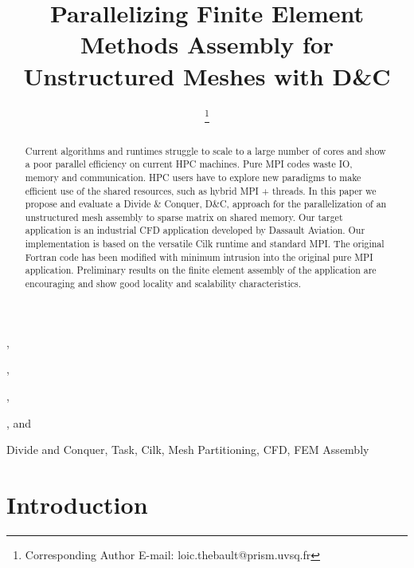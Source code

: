 \documentclass{IOS-Book-Article}
\begin{document}
\begin{frontmatter}              %

\title{Parallelizing Finite Element Methods Assembly for Unstructured Meshes with D\&C}

\author[A]{ %
\thanks{Corresponding Author E-mail: loic.thebault@prism.uvsq.fr}},
\author[A]{ },
\author[D]{ },
\author[B]{ },
and
\author[A,D]{ }

\address[A]{PRISM - University of Versailles, France}
\address[B]{Dassault Aviation, Saint-Cloud, France}
\address[D]{Exascale Computing Research, France}

\begin{abstract}
Current algorithms and runtimes struggle to scale to a large number of cores and show a poor parallel efficiency on current HPC machines.
Pure MPI codes waste IO, memory and communication. HPC users have to explore new paradigms to make efficient use of the shared resources,
such as hybrid MPI + threads.
In this paper we propose and evaluate a Divide \& Conquer, D\&C, approach for the parallelization of an unstructured mesh assembly to sparse matrix on shared memory.
Our target application is an industrial CFD application developed by Dassault Aviation.
Our implementation is based on the versatile Cilk runtime and standard MPI.
The original Fortran code has been modified with minimum intrusion into the original pure MPI application.
Preliminary results on the finite element assembly of the application are encouraging and show good locality and scalability characteristics.
\end{abstract}

\begin{keyword}
Divide and Conquer, Task, Cilk, Mesh Partitioning, CFD, FEM Assembly
\end{keyword}
\end{frontmatter}

\thispagestyle{empty}
\pagestyle{empty}

\section{Introduction}
\end{document}
